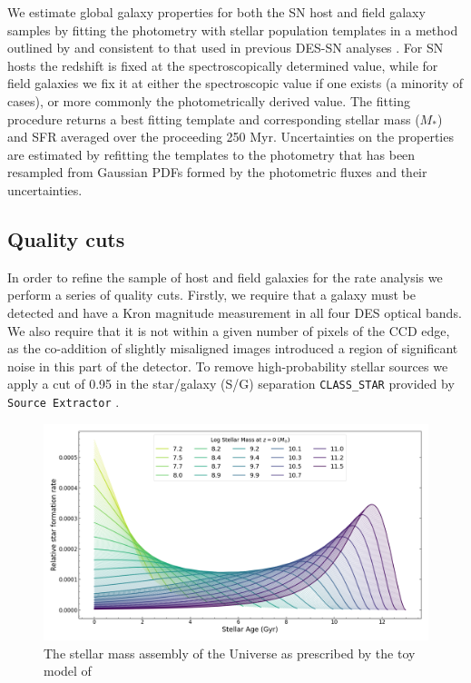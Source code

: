 \documentclass[fleqn,usenatbib]{mnras}
\begin{document}
We estimate global galaxy properties for both the SN host and field galaxy samples by fitting the photometry with stellar population templates in a method outlined by \citet{Sullivan2006} and consistent to that used in previous DES-SN analyses \citep{Kelsey2020,Smith2020,Wiseman2020}. For SN hosts the redshift is fixed at the spectroscopically determined value, while for field galaxies we fix it at either the spectroscopic value if one exists (a minority of cases), or more commonly the photometrically derived value. The fitting procedure returns a best fitting template and corresponding stellar mass ($M_*$) and SFR averaged over the proceeding 250 Myr. Uncertainties on the properties are estimated by refitting the templates to the photometry that has been resampled from Gaussian PDFs formed by the photometric fluxes and their uncertainties. 

\subsection{Quality cuts \label{subsec:cuts}}

In order to refine the sample of host and field galaxies for the rate analysis we perform a series of quality cuts. Firstly, we require that a galaxy must be detected and have a Kron magnitude measurement in all four DES optical bands. We also require that it is not within a given number of pixels of the CCD edge, as the co-addition of slightly misaligned images introduced a region of significant noise in this part of the detector. To remove high-probability stellar sources we apply a cut of 0.95 in the star/galaxy (S/G) separation \texttt{CLASS\_STAR} provided by \texttt{Source Extractor} \citep{Bertin1996}. 


\begin{figure}
    \centering
    \includegraphics[width=\textwidth]{figs/SFHs_colour.png}
    \caption{The stellar mass assembly of the Universe as prescribed by the toy model of \citet{Childress2014}}
    \label{fig:SFHs}
\end{figure}
\end{document}
